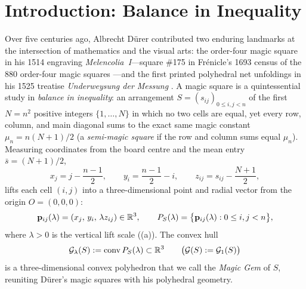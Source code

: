 \section{Introduction: Balance in Inequality}
\label{sec:intro}

Over five centuries ago, Albrecht D\"urer contributed two enduring landmarks at the intersection of mathematics and the visual arts: the order-four magic square in his 1514 engraving \emph{Melencolia~I}—square \#175 in Fr\'enicle's 1693 census of the $880$ order-four magic squares \citep{andrews1960magic,dudeney1917amusements,frenicle1693}—and the first printed polyhedral net unfoldings in his 1525 treatise \emph{Underweysung der Messung} \citep{demaine2007geometric,durer1525underweysung,ghomi2014durer,shephard1975convex}. A magic square is a quintessential study in \emph{balance in inequality}: an arrangement $S=(s_{ij})_{0\le i,j<n}$ of the first $N=n^2$ positive integers $\{1,\dots,N\}$ in which no two cells are equal, yet every row, column, and main diagonal sums to the exact same magic constant $\mu_n=n(N+1)/2$ (a \emph{semi-magic square} if the row and column sums equal $\mu_n$). Measuring coordinates from the board centre and the mean entry $\bar s=(N+1)/2$,
\begin{equation}
\label{eq:coords}
x_j = j - \frac{n-1}{2},\qquad
y_i = \frac{n-1}{2} - i,\qquad
z_{ij} = s_{ij} - \frac{N+1}{2},
\end{equation}
lifts each cell $(i,j)$ into a three-dimensional point and radial vector from the origin $O=(0,0,0)$:
\[
\mathbf p_{ij}(\lambda) = (x_j,\, y_i,\, \lambda z_{ij}) \in \mathbb{R}^3,\qquad
P_S(\lambda) = \bigl\{\mathbf p_{ij}(\lambda) : 0\le i,j<n\bigr\},
\]
where $\lambda>0$ is the vertical lift scale ((a)). The convex hull
\[
\mathcal G_\lambda(S) := \operatorname{conv} P_S(\lambda) \subset \mathbb{R}^3
\qquad\bigl(\mathcal G(S):=\mathcal G_1(S)\bigr)
\]
is a three-dimensional convex polyhedron that we call the \emph{Magic Gem} of $S$, reuniting D\"urer's magic squares with his polyhedral geometry.

